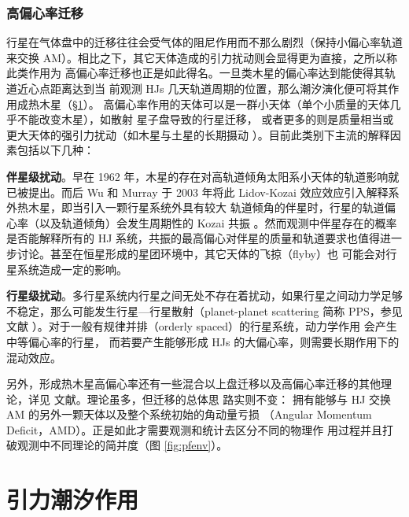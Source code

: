 \subsubsection{高偏心率迁移} \label{sec:highemig}

行星在气体盘中的迁移往往会受气体的阻尼作用而不那么剧烈（保持小偏心率轨道来交换
AM）。相比之下，其它天体造成的引力扰动则会显得更为直接，之所以称此类作用为
高偏心率迁移也正是如此得名。一旦类木星的偏心率达到能使得其轨道近心点距离达到当
前观测 HJs 几天轨道周期的位置，那么潮汐演化便可将其作用成热木星（\S \ref{sec:tidal}）。
高偏心率作用的天体可以是一群小天体（单个小质量的天体几乎不能改变木星），如散射
星子盘导致的行星迁移\cite{Malhotra1993,Murray1998,Morbidelli2007,Thommes2008}，
或者更多的则是质量相当或更大天体的强引力扰动（如木星与土星的长期摄动
\cite{MurrayDermott1999ssd}）。目前此类别下主流的解释因素包括以下几种：

\textbf{伴星级扰动}。早在 1962 年，木星的存在对高轨道倾角太阳系小天体的轨道影响就
已被提出\cite{Lidov1962,Kozai1962}。而后 Wu 和 Murray 于 2003 年将此 Lidov-Kozai 
效应效应引入解释系外热木星\cite{WuMurray2003}，即当引入一颗行星系统外具有较大
轨道倾角的伴星时，行星的轨道偏心率（以及轨道倾角）会发生周期性的 Kozai 共振
\cite{Innanen1997}。然而观测中伴星存在的概率是否能解释所有的 HJ 系统\cite{Wu2007,
Fabrycky2007}，共振的最高偏心对伴星的质量和轨道要求也值得进一步讨论\cite{
Naoz2011,Nagasawa2011}。甚至在恒星形成的星团环境中，其它天体的飞掠（flyby）也
可能会对行星系统造成一定的影响\cite{Spurzem2009}。

\textbf{行星级扰动}。多行星系统内行星之间无处不存在着扰动，如果行星之间动力学足够
不稳定，那么可能发生行星---行星散射（planet-planet scattering 简称 PPS，参见文献
）。对于一般有规律并排（orderly spaced）的行星系统，动力学作用
会产生中等偏心率的行星\cite{Zhou2007,IdaLin2013,Lin1997,Juric2008,Chatterjee2008}，
而若要产生能够形成 HJs 的大偏心率，则需要长期作用下的混动效应\cite{Wu2011}。

另外，形成热木星高偏心率还有一些混合以上盘迁移以及高偏心率迁移的其他理论，详见
文献。理论虽多，但迁移的总体思
路实则不变： 拥有能够与 HJ 交换 AM 的另外一颗天体以及整个系统初始的角动量亏损
（Angular Momentum Deficit，AMD）。正是如此才需要观测和统计去区分不同的物理作
用过程并且打破观测中不同理论的简并度（图 \ref{fig:pfenv}）。


\section{引力潮汐作用} \label{sec:tidal}

